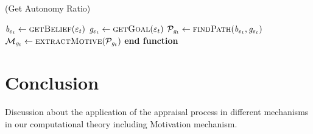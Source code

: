 \documentclass[letterpaper]{article}
\begin{document}
\begin{algorithm}
	\caption{(Get Autonomy Ratio)}
	\label{array-sum}
	\begin{algorithmic}[1]
			\Statex
			\State $\mathit{b}_{\varepsilon_t} \gets \Call{getBelief}{\varepsilon_t}$
			\State $\mathit{g}_{\varepsilon_t} \gets \Call{getGoal}{\varepsilon_t}$
			\Statex
			\State $\mathcal{P}_{\mathit{g}_{t}} \gets \Call{findPath}{\mathit{b}_{\varepsilon_t},
			\mathit{g}_{\varepsilon_t}}$
			\Statex
				\State $\mathcal{M}_{\mathit{g}_{t}} \gets
				\Call{extractMotive}{\mathcal{P}_{\mathit{g}_{t}}}$
					 \State {}
					\Else
						\State {}
					\EndIf
				\Else
					\State {}
				\EndIf
			\EndIf
		\EndFunction 
	\State \textbf{end function}
	\end{algorithmic}
\end{algorithm}

\section{Conclusion}

Discussion about the application of the appraisal process in different
mechanisms in our computational theory including Motivation mechanism. 



\end{document}
